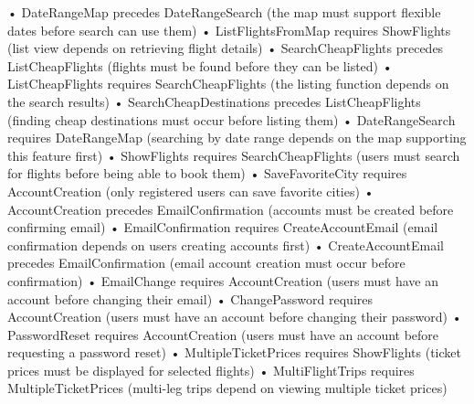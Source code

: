 •	DateRangeMap precedes DateRangeSearch (the map must support flexible dates before search can use them)
•	ListFlightsFromMap requires ShowFlights (list view depends on retrieving flight details)
•	SearchCheapFlights precedes ListCheapFlights (flights must be found before they can be listed)
•	ListCheapFlights requires SearchCheapFlights (the listing function depends on the search results)
•	SearchCheapDestinations precedes ListCheapFlights (finding cheap destinations must occur before listing them)
•	DateRangeSearch requires DateRangeMap (searching by date range depends on the map supporting this feature first)
•	ShowFlights requires SearchCheapFlights (users must search for flights before being able to book them)
•	SaveFavoriteCity requires AccountCreation (only registered users can save favorite cities)
•	AccountCreation precedes EmailConfirmation (accounts must be created before confirming email)
•	EmailConfirmation requires CreateAccountEmail (email confirmation depends on users creating accounts first)
•	CreateAccountEmail precedes EmailConfirmation (email account creation must occur before confirmation)
•	EmailChange requires AccountCreation (users must have an account before changing their email)
•	ChangePassword requires AccountCreation (users must have an account before changing their password)
•	PasswordReset requires AccountCreation (users must have an account before requesting a password reset)
•	MultipleTicketPrices requires ShowFlights (ticket prices must be displayed for selected flights)
•	MultiFlightTrips requires MultipleTicketPrices (multi-leg trips depend on viewing multiple ticket prices)